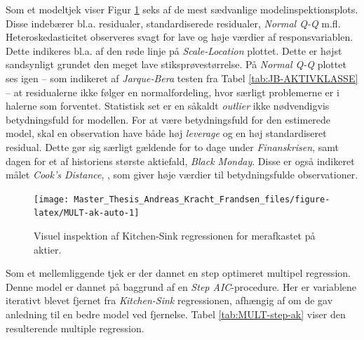 \documentclass[
  a4paper,
  oneside]{memoir}
\begin{document}
Som et modeltjek viser Figur \ref{fig:MULT-ak-auto} seks af de mest sædvanlige modelinspektionsplots. Disse indebærer bl.a. residualer, standardiserede residualer, \emph{Normal Q-Q} m.fl. Heteroskedasticitet observeres svagt for lave og høje værdier af responsvariablen. Dette indikeres bl.a. af den røde linje på \emph{Scale-Location} plottet. Dette er højst sandsynligt grundet den meget lave stiksprøvestørrelse. På \emph{Normal Q-Q} plottet ses igen -- som indikeret af \emph{Jarque-Bera} testen fra Tabel \ref{tab:JB-AKTIVKLASSE} -- at residualerne ikke følger en normalfordeling, hvor særligt problemerne er i halerne som forventet. Statistisk set er en såkaldt \emph{outlier} ikke nødvendigvis betydningsfuld for modellen. For at være betydningsfuld for den estimerede model, skal en observation have både høj \emph{leverage} og en høj standardiseret residual. Dette gør sig særligt gældende for to dage under \emph{Finanskrisen}, samt dagen for et af historiens største aktiefald, \emph{Black Monday}. Disse er også indikeret målet \emph{Cook's Distance}, \citep{Cook1977}, som giver høje værdier til betydningsfulde observationer.

\begin{figure}[H]

{\centering \texttt{[image: Master\_Thesis\_Andreas\_Kracht\_Frandsen\_files/figure-latex/MULT-ak-auto-1]} 

}

\caption{Visuel inspektion af Kitchen-Sink regressionen for merafkastet på aktier.}\label{fig:MULT-ak-auto}
\end{figure}

Som et mellemliggende tjek er der dannet en step optimeret multipel regression. Denne model er dannet på baggrund af en \emph{Step AIC}-procedure. Her er variablene iterativt blevet fjernet fra \emph{Kitchen-Sink} regressionen, afhængig af om de gav anledning til en bedre model ved fjernelse. Tabel \ref{tab:MULT-step-ak} viser den resulterende multiple regression.
\end{document}
